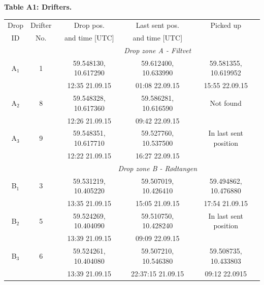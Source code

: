 \documentclass[12pt,a4paper,english]{article}
\begin{document}
\begin{table}[tb]
{\bf Table A1: Drifters.}\\
\label{tab:Drifters}
\begin{tabular}{|c|c|ccc|} 
        \hline
        Drop & Drifter & Drop pos.            & Last sent pos.          & Picked up                  \\
        ID  & No.     & and time [UTC]       & and time [UTC]          &                            \\ \hline
             &         &          \multicolumn{3}{c|}{\textit{Drop zone A - Filtvet}}                 \\ 
        A$_1$& 1       & 59.548130, 10.617290 & 59.612400, 10.633990    & 59.581355, 10.619952       \\
             &         & 12:35 21.09.15       & 01:08 22.09.15          & 15:55 22.09.15             \\ 
        A$_2$& 8       & 59.548328, 10.617360 & 59.586281, 10.616590    & Not found                  \\
             &         & 12:26 21.09.15       & 09:42 22.09.15          &                            \\
        A$_3$& 9       & 59.548351, 10.617710 & 59.527760, 10.537500    & In last sent position      \\
             &         & 12:22 21.09.15       & 16:27 22.09.15          &                            \\ \hline 
             &         &          \multicolumn{3}{c|}{\textit{Drop zone B - R\o dtangen}}             \\
        B$_1$& 3       & 59.531219, 10.405220 & 59.507019, 10.426410    & 59.494862, 10.476880       \\
             &         & 13:35 21.09.15       & 15:05 21.09.15          & 17:54 21.09.15             \\
        B$_2$& 5       & 59.524269, 10.404090 & 59.510750, 10.428240    & In last sent position     \\
             &         & 13:39 21.09.15       & 09:09 22.09.15          &                            \\
        B$_3$& 6       & 59.524261, 10.404080 & 59.507210, 10.546380    & 59.508735, 10.433803       \\
             &         & 13:39 21.09.15       & 22:37:15 21.09.15       & 09:12 22.0915              \\

\end{tabular}
\end{table}
\end{document}
